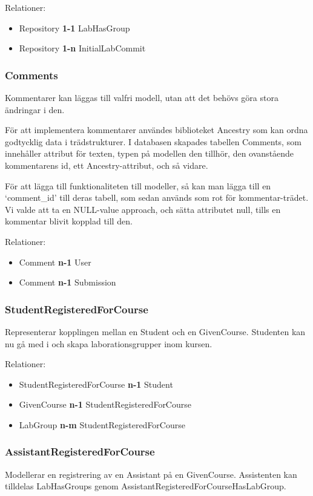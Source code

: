 Relationer: 
\begin{itemize}
  \item Repository {\bf 1-1} LabHasGroup 
  \item Repository {\bf 1-n} InitialLabCommit 
\end{itemize}

\subsubsection{Comments}
Kommentarer kan läggas till valfri modell, utan att det behövs göra stora ändringar i den. 

För att implementera kommentarer användes biblioteket Ancestry som kan ordna godtycklig data i trädstrukturer. I databasen skapades tabellen Comments, som innehåller attribut för texten, typen på modellen den tillhör, den ovanstående kommentarens id, ett Ancestry-attribut, och så vidare. 

För att lägga till funktionaliteten till modeller, så kan man lägga till en ‘comment\_id’ till deras tabell, som sedan används som rot för kommentar-trädet. Vi valde att ta en NULL-value approach, och sätta attributet null, tills en kommentar blivit kopplad till den.

Relationer: 
\begin{itemize}
  \item Comment {\bf n-1} User 
  \item Comment {\bf n-1} Submission 
\end{itemize}
    
\subsubsection{StudentRegisteredForCourse}
Representerar kopplingen mellan en Student och en GivenCourse. Studenten kan nu gå med i och skapa laborationsgrupper inom kursen.

Relationer: 
\begin{itemize}
  \item StudentRegisteredForCourse {\bf n-1} Student 
  \item GivenCourse {\bf n-1} StudentRegisteredForCourse
  \item LabGroup {\bf n-m } StudentRegisteredForCourse
\end{itemize}

\subsubsection{AssistantRegisteredForCourse}
Modellerar en registrering av en Assistant på en GivenCourse. Assistenten kan tilldelas LabHasGroups genom AssistantRegisteredForCourseHasLabGroup.

